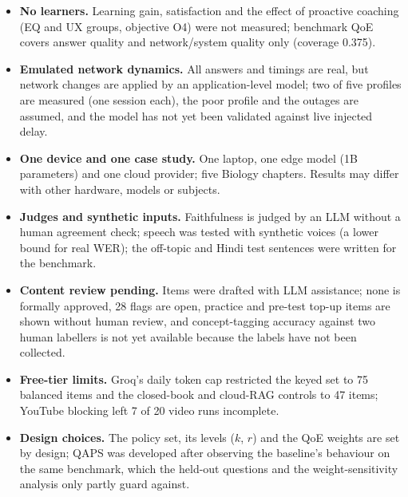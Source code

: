 \begin{itemize}
  \item \textbf{No learners.} Learning gain, satisfaction and the effect of proactive coaching (EQ and UX
    groups, objective O4) were not measured; benchmark QoE covers answer quality and network/system
    quality only (coverage 0.375).
  \item \textbf{Emulated network dynamics.} All answers and timings are real, but network changes are
    applied by an application-level model; two of five profiles are measured (one session each), the poor
    profile and the outages are assumed, and the model has not yet been validated against live injected
    delay.
  \item \textbf{One device and one case study.} One laptop, one edge model (1B parameters) and one cloud
    provider; five Biology chapters. Results may differ with other hardware, models or subjects.
  \item \textbf{Judges and synthetic inputs.} Faithfulness is judged by an LLM without a human
    agreement check; speech was tested with synthetic voices (a lower bound for real WER); the off-topic
    and Hindi test sentences were written for the benchmark.
  \item \textbf{Content review pending.} Items were drafted with LLM assistance; none is formally
    approved, 28 flags are open, practice and pre-test top-up items are shown without human review, and
    concept-tagging accuracy against two human labellers is not yet available because the labels have not
    been collected.
  \item \textbf{Free-tier limits.} Groq's daily token cap restricted the keyed set to 75 balanced items
    and the closed-book and cloud-RAG controls to 47 items; YouTube blocking left 7 of 20 video runs
    incomplete.
  \item \textbf{Design choices.} The policy set, its levels ($k$, $r$) and the QoE weights are set by
    design; QAPS was developed after observing the baseline's behaviour on the same benchmark, which the
    held-out questions and the weight-sensitivity analysis only partly guard against.
\end{itemize}
